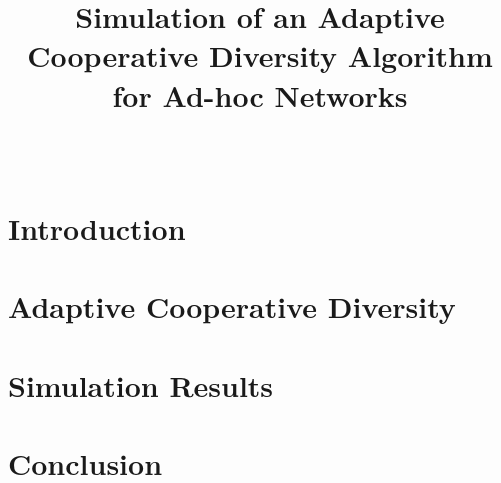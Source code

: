 \documentclass[journal]{IEEEtran}
\begin{document}
\title{Simulation of an Adaptive Cooperative Diversity Algorithm for Ad-hoc Networks}

\author{\\
}

\maketitle


\begin{abstract}

\end{abstract}

\begin{keywords}

\end{keywords}

\section{Introduction}


\section{Adaptive Cooperative Diversity}


\section{Simulation Results}


\section{Conclusion}


\nocite{*}


\end{document}
